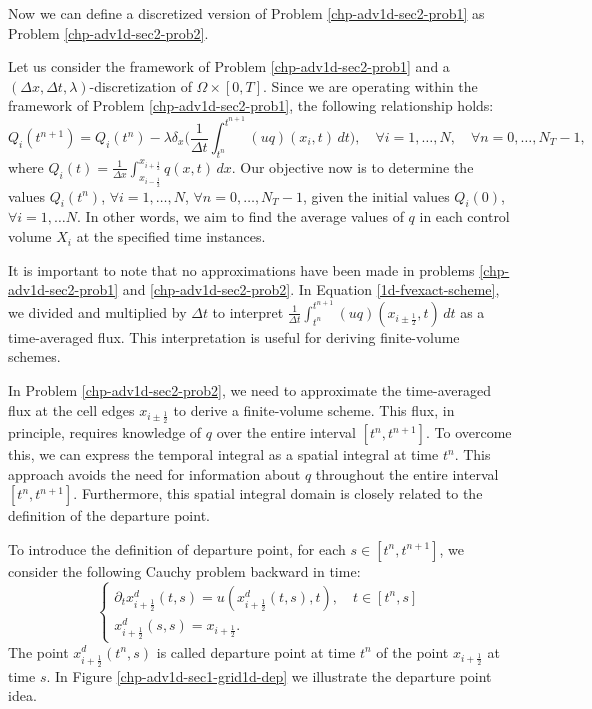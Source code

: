 Now we can define a discretized version of Problem \ref{chp-adv1d-sec2-prob1} as Problem \ref{chp-adv1d-sec2-prob2}.
\begin{prob}
	\label{chp-adv1d-sec2-prob2}
	Let us consider the framework
	of Problem \ref{chp-adv1d-sec2-prob1} and a $(\Delta x, \Delta t, \lambda)$-discretization of 
	$\Omega \times [0,T]$. Since we are operating within the framework of Problem \ref{chp-adv1d-sec2-prob1}, the following relationship holds:
	\begin{equation}
		\label{1d-fvexact-scheme}
		{Q}_i(t^{n+1}) = {Q}_i(t^{n}) - \lambda \delta_x\bigg( \frac{1}{\Delta t}\int_{t^{n}}^{t^{n+1}}{(uq)}(x_{i}, t) \,dt \bigg),
		 \quad \forall i = 1, \ldots, N, \quad \forall n = 0, \ldots, N_T-1,
	\end{equation}
	where ${Q}_i(t) = \frac{1}{\Delta x}\int_{x_{i-\frac{1}{2}}}^{x_{i+\frac{1}{2}}} {q}(x,t) \,dx$. 
	Our objective now is to determine the values ${Q}_i(t^{n})$, $\forall i = 1, \ldots, N$, $\forall n = 0, \ldots, N_T-1$,
	given the initial values ${Q}_i(0)$, $\forall i = 1, \ldots N$. 
	In other words, we aim to find the average values of ${q}$ in each control volume $X_i$ at the specified time instances.
\end{prob}
It is important to note that no approximations have been made in problems \eqref{chp-adv1d-sec2-prob1} and \eqref{chp-adv1d-sec2-prob2}. 
In Equation \eqref{1d-fvexact-scheme}, we divided and multiplied by $\Delta t$ to interpret
$\frac{1}{\Delta t}\int_{t^{n}}^{t^{n+1}}({uq})(x_{i\pm \frac{1}{2}}, t) \,dt$ 
as a time-averaged flux. This interpretation is useful for deriving finite-volume schemes.

In Problem \ref{chp-adv1d-sec2-prob2}, we need to approximate the time-averaged flux at the cell edges $x_{i\pm\frac{1}{2}}$
to derive a finite-volume scheme. This flux, in principle, requires knowledge of $q$ over the entire interval $[t^n, t^{n+1}]$. 
To overcome this, we can express the temporal integral as a spatial integral at time $t^n$. 
This approach avoids the need for information about $q$ throughout the entire interval $[t^n, t^{n+1}]$. 
Furthermore, this spatial integral domain is closely related to the definition of the 
departure point. 

To introduce the definition of departure point, for each $s \in [t^n,t^{n+1}]$,
we consider the following Cauchy problem backward in time:
\begin{equation}
	\label{chp-sec-flux:analysis-eq3}
	\begin{cases}
		\partial_t x^d_{i+\frac{1}{2}} (t,s) = u(x^d_{i+\frac{1}{2}}(t,s) ,t),\quad t\in[t^{n},s] \\
		x^d_{i+\frac{1}{2}}(s,s) = x_{i+\frac{1}{2}}.
	\end{cases}
\end{equation}
The point $x^d_{i+\frac{1}{2}}(t^n,s)$ is called departure point at time $t^n$
of the point $x_{i+\frac{1}{2}}$ at time $s$.
In Figure \ref{chp-adv1d-sec1-grid1d-dep} we illustrate the departure point idea.

